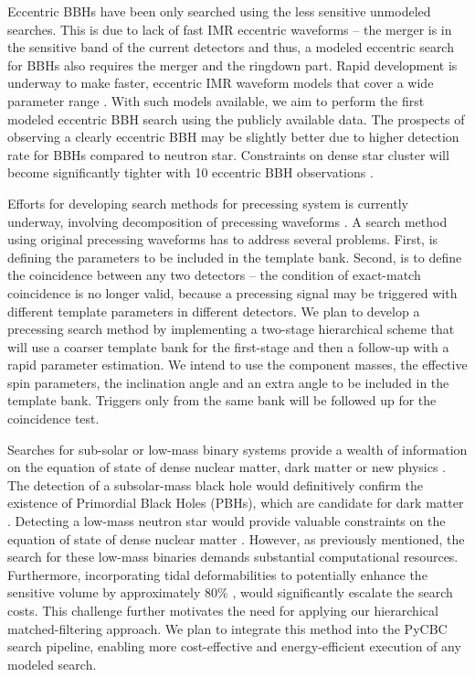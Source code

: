 Eccentric BBHs have been only searched using the less sensitive unmodeled searches. This is due to lack of fast IMR eccentric waveforms -- the merger is in the sensitive band of the current detectors and thus, a modeled eccentric search for BBHs also requires the merger and the ringdown part. Rapid development is underway to make faster, eccentric IMR waveform models that cover a wide parameter range \cite{Klein:2021jtd, Joshi:2022ocr}. With such models available, we aim to perform the first modeled eccentric BBH search using the publicly available data. The prospects of observing a clearly eccentric BBH may be slightly better due to higher detection rate for BBHs compared to neutron star. Constraints on dense star cluster will become significantly tighter with 10 eccentric BBH observations \cite{Zevin:2021rtf}.      

Efforts for developing search methods for precessing system is currently underway, involving decomposition of precessing waveforms \cite{McIsaac:2023ijd,Fairhurst:2019vut}. A search method using original precessing waveforms has to address several problems. First, is defining the parameters to be included in the template bank. Second, is to define the coincidence between any two detectors -- the condition of exact-match coincidence is no longer valid, because a precessing signal may be triggered with different template parameters in different detectors. We plan to develop a precessing search method by implementing a two-stage hierarchical scheme that will use a coarser template bank for the first-stage and then a follow-up with a rapid parameter estimation. We intend to use the component masses, the effective spin parameters, the inclination angle and an extra angle to be included in the template bank. Triggers only from the same bank will be followed up for the coincidence test. 

% 
Searches for sub-solar or low-mass binary systems provide a wealth of information on the equation of state of dense nuclear matter, dark matter or new physics \cite{Nitz:2022ltl,LIGOScientific:2022hai}. The detection of a subsolar-mass black hole would definitively confirm the existence of Primordial Black Holes (PBHs), which are candidate for dark matter \cite{Sasaki:2018dmp, Carr:2020gox}. Detecting a low-mass neutron star would provide valuable constraints on the equation of state of dense nuclear matter \cite{Silva:2016myw}. However, as previously mentioned, the search for these low-mass binaries demands substantial computational resources. Furthermore, incorporating tidal deformabilities to potentially enhance the sensitive volume by approximately $80\%$ \cite{Bandopadhyay:2022tbi}, would significantly escalate the search costs. This challenge further motivates the need for applying our hierarchical matched-filtering approach. We plan to integrate this method into the PyCBC search pipeline, enabling more cost-effective and energy-efficient execution of any modeled search.

